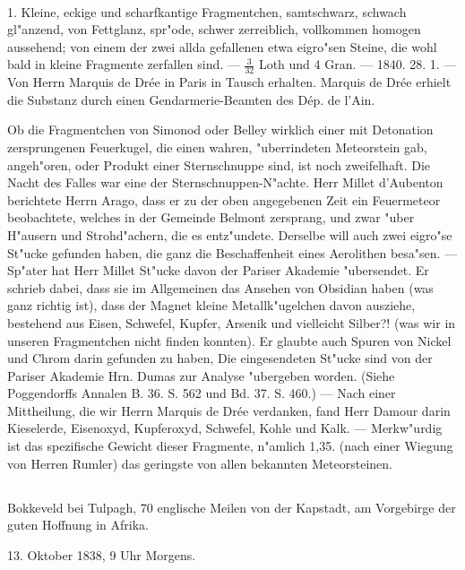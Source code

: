 \documentclass[a4paper, 11pt, oneside, polutonikogreek, german]{article}
\begin{document}
\paragraph{}
1. Kleine, eckige und scharfkantige Fragmentchen, samtschwarz, schwach gl"anzend, von Fettglanz, spr"ode, schwer zerreiblich, vollkommen homogen aussehend; von einem der zwei allda gefallenen etwa eigro"sen Steine, die wohl bald in kleine Fragmente zerfallen sind. --- $\mathfrak{\frac{3}{32}}$ Loth und 4 Gran. --- 1840. 28. 1. --- Von Herrn Marquis de Drée in Paris in Tausch erhalten. Marquis de Drée erhielt die Substanz durch einen Gendarmerie-Beamten des Dép. de l'Ain.

\setlength{\leftskip}{10mm}
\setlength{\parindent}{0pt}

{\footnotesize Ob die Fragmentchen von Simonod oder Belley wirklich einer mit Detonation zersprungenen Feuerkugel, die einen wahren, "uberrindeten Meteorstein gab, angeh"oren, oder Produkt einer Sternschnuppe sind, ist noch zweifelhaft. Die Nacht des Falles war eine der Sternschnuppen-N"achte. Herr Millet d’Aubenton berichtete Herrn Arago, dass er zu der oben angegebenen Zeit ein Feuermeteor beobachtete, welches in der Gemeinde Belmont zersprang, und zwar "uber H"ausern und Strohd"achern, die es entz"undete. Derselbe will auch zwei eigro"se St"ucke gefunden haben, die ganz die Beschaffenheit eines Aerolithen besa"sen. --- Sp"ater hat Herr Millet St"ucke davon der Pariser Akademie "ubersendet. Er schrieb dabei, dass sie im Allgemeinen das Ansehen von Obsidian haben (was ganz richtig ist), dass der Magnet kleine Metallk"ugelchen davon ausziehe, bestehend aus Eisen, Schwefel, Kupfer, Arsenik und vielleicht Silber?! (was wir in unseren Fragmentchen nicht finden konnten). Er glaubte auch Spuren von Nickel und Chrom darin gefunden zu haben, Die eingesendeten St"ucke sind von der Pariser Akademie Hrn. Dumas zur Analyse "ubergeben worden. (Siehe Poggendorffs Annalen B. 36. S. 562 und Bd. 37. S. 460.) --- Nach einer Mittheilung, die wir Herrn Marquis de Drée verdanken, fand Herr Damour darin Kieselerde, Eisenoxyd, Kupferoxyd, Schwefel, Kohle und Kalk. --- Merkw"urdig ist das spezifische Gewicht dieser Fragmente‚ n"amlich 1,35. (nach einer Wiegung von Herren Rumler) das geringste von allen bekannten Meteorsteinen.}

\setlength{\leftskip}{0pt}
\setlength{\parindent}{20pt}
\subsection{}
\begin{center}
Bokkeveld bei Tulpagh, 70 englische Meilen von der Kapstadt, am Vorgebirge der guten Hoffnung in Afrika.

13. Oktober 1838, 9 Uhr Morgens.
\end{center}
\end{document}
